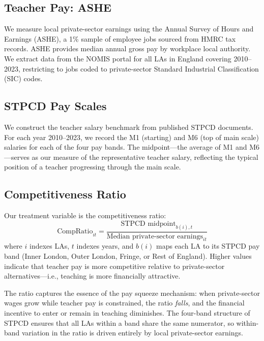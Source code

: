 \documentclass[12pt]{article}
\begin{document}
\subsection{Teacher Pay: ASHE}

We measure local private-sector earnings using the Annual Survey of Hours and Earnings (ASHE), a 1\% sample of employee jobs sourced from HMRC tax records. ASHE provides median annual gross pay by workplace local authority. We extract data from the NOMIS portal for all LAs in England covering 2010--2023, restricting to jobs coded to private-sector Standard Industrial Classification (SIC) codes.

\subsection{STPCD Pay Scales}

We construct the teacher salary benchmark from published STPCD documents. For each year 2010--2023, we record the M1 (starting) and M6 (top of main scale) salaries for each of the four pay bands. The midpoint---the average of M1 and M6---serves as our measure of the representative teacher salary, reflecting the typical position of a teacher progressing through the main scale.

\subsection{Competitiveness Ratio}

Our treatment variable is the competitiveness ratio:
\begin{equation}
\label{eq:comp}
\text{CompRatio}_{it} = \frac{\text{STPCD midpoint}_{b(i),t}}{\text{Median private-sector earnings}_{it}}
\end{equation}
where $i$ indexes LAs, $t$ indexes years, and $b(i)$ maps each LA to its STPCD pay band (Inner London, Outer London, Fringe, or Rest of England). Higher values indicate that teacher pay is more competitive relative to private-sector alternatives---i.e., teaching is more financially attractive.

The ratio captures the essence of the pay squeeze mechanism: when private-sector wages grow while teacher pay is constrained, the ratio \textit{falls}, and the financial incentive to enter or remain in teaching diminishes. The four-band structure of STPCD ensures that all LAs within a band share the same numerator, so within-band variation in the ratio is driven entirely by local private-sector earnings.
\end{document}
